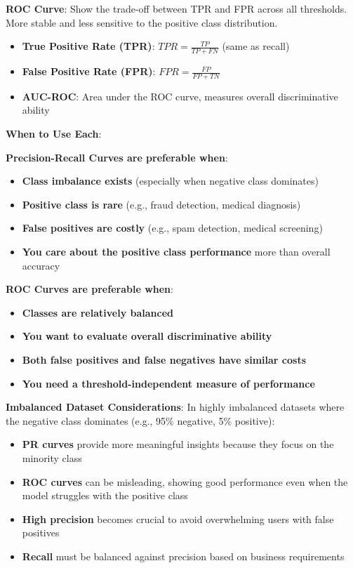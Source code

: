 \textbf{ROC Curve}:
Show the trade-off between TPR and FPR across all thresholds. More stable and less sensitive to the positive class distribution.
\begin{itemize}
	\item \textbf{True Positive Rate (TPR)}: $TPR = \frac{TP}{TP + FN}$ (same as recall)
	\item \textbf{False Positive Rate (FPR)}: $FPR = \frac{FP}{FP + TN}$
	\item \textbf{AUC-ROC}: Area under the ROC curve, measures overall discriminative ability
\end{itemize}

\textbf{When to Use Each}:

\textbf{Precision-Recall Curves are preferable when}:
\begin{itemize}
	\item \textbf{Class imbalance exists} (especially when negative class dominates)
	\item \textbf{Positive class is rare} (e.g., fraud detection, medical diagnosis)
	\item \textbf{False positives are costly} (e.g., spam detection, medical screening)
	\item \textbf{You care about the positive class performance} more than overall accuracy
\end{itemize}

\textbf{ROC Curves are preferable when}:
\begin{itemize}
	\item \textbf{Classes are relatively balanced}
	\item \textbf{You want to evaluate overall discriminative ability}
	\item \textbf{Both false positives and false negatives have similar costs}
	\item \textbf{You need a threshold-independent measure of performance}
\end{itemize}

\textbf{Imbalanced Dataset Considerations}:
In highly imbalanced datasets where the negative class dominates (e.g., 95\% negative, 5\% positive):

\begin{itemize}
	\item \textbf{PR curves} provide more meaningful insights because they focus on the minority class
	\item \textbf{ROC curves} can be misleading, showing good performance even when the model struggles with the positive class
	\item \textbf{High precision} becomes crucial to avoid overwhelming users with false positives
	\item \textbf{Recall} must be balanced against precision based on business requirements
\end{itemize}

